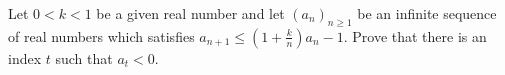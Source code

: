 Let $0<k<1$ be a given real number and let $(a_n)_{n\ge1}$ be an infinite sequence of real numbers which satisfies $a_{n+1}\le\left(1+\frac kn\right)a_n-1$. Prove that there is an index $t$ such that $a_t<0$.